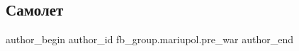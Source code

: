  
 
 
 
 

\subsection{Самолет}
\label{sec:03_02_2023.fb.fb_group.mariupol.pre_war.2.samolet}

\ifcmt
 author_begin
   author_id fb_group.mariupol.pre_war
 author_end
\fi

